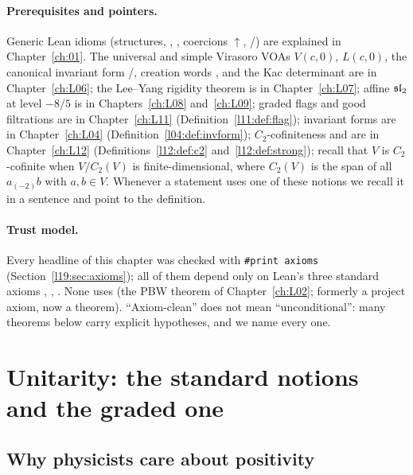 \paragraph{Prerequisites and pointers.} Generic Lean idioms (structures, ,
, coercions $\uparrow$, /) are explained in Chapter~\ref{ch:01}.
The universal and simple Virasoro VOAs $V(c,0)$, $L(c,0)$, the canonical invariant form
/, creation words , and the Kac determinant are in
Chapter~\ref{ch:L06}; the Lee--Yang rigidity theorem is in Chapter~\ref{ch:L07}; affine $\mathfrak{sl}_2$
at level $-8/5$ is in Chapters~\ref{ch:L08} and~\ref{ch:L09}; graded flags and good filtrations are
in Chapter~\ref{ch:L11} (Definition~\ref{l11:def:flag}); invariant forms are in
Chapter~\ref{ch:L04} (Definition~\ref{l04:def:invform}); $C_2$-cofiniteness and
 are in Chapter~\ref{ch:L12} (Definitions~\ref{l12:def:c2}
and~\ref{l12:def:strong}); recall that $V$ is $C_2$-cofinite when $V/C_2(V)$ is finite-dimensional, where
$C_2(V)$ is the span of all $a_{(-2)}b$ with $a,b\in V$. Whenever a statement uses one of these notions we recall it in a sentence
and point to the definition.

\paragraph{Trust model.} Every headline of this chapter was checked with \texttt{\#print axioms}
(Section~\ref{l19:sec:axioms}); all of them depend only on Lean's three standard axioms
, , . None uses  (the PBW theorem of Chapter~\ref{ch:L02}; formerly a project axiom, now a theorem). ``Axiom-clean'' does not mean ``unconditional'': many theorems below carry
explicit hypotheses, and we name every one.

\section{Unitarity: the standard notions and the graded one}\label{l19:sec:notions}

\subsection{Why physicists care about positivity}

